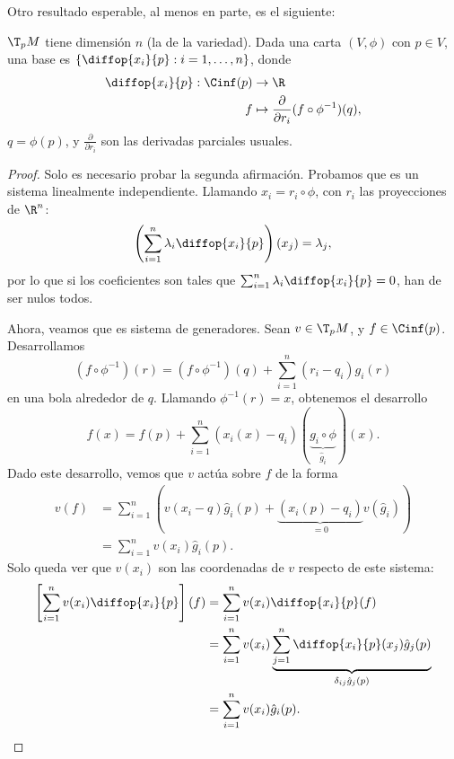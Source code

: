 Otro resultado esperable, al menos en parte, es el siguiente:
\begin{nth} \label{thm:base-parciales}
  $\T_{p}M$ tiene dimensión $n$ (la de la variedad). Dada una carta $(V,\phi)$
  con $p\in V$, una base es $\left\{ \diffop{x_{i}}{p} : i=1,\dots,n \right\}$, donde
  \begin{alignat*}{2}
    \diffop{x_{i}}{p}: \Cinf(p)  & \to \R \\
    f & \mapsto \frac{\partial}{\partial r_{i}}(f\circ \phi^{-1})(q),
  \end{alignat*}
  $q = \phi(p)$, y $\frac{\partial}{\partial r_{i}}$ son las derivadas parciales usuales.
\end{nth}
\begin{proof}
  Solo es necesario probar la segunda afirmación. Probamos que es un sistema
  linealmente independiente. Llamando $x_{i} = r_{i}\circ\phi$, con $r_{i}$ las
  proyecciones de $\R^{n}$:
  \[
    \left( \sum_{i=1}^{n} \lambda_{i} \diffop{x_{i}}{p} \right)(x_{j}) = \lambda_{j}
  ,\]
  por lo que si los coeficientes son tales que $\sum_{i=1}^{n} \lambda_{i}\diffop{x_{i}}{p}
  = 0$, han de ser nulos todos.

  Ahora, veamos que es sistema de generadores. Sean $v\in \T_{p}M$, y
  $f\in\Cinf(p)$. Desarrollamos
  \[
    (f\circ \phi^{-1})(r) = (f\circ \phi^{-1})(q) + \sum_{i=1}^{n}(r_{i}-q_{i})g_{i}(r)
  \]
  en una bola alrededor de $q$. Llamando $\phi^{-1}(r) = x$, obtenemos el
  desarrollo
  \[
    f(x) = f(p) + \sum_{i=1}^{n} (x_{i}(x) - q_{i})(\underbrace{g_{i}\circ\phi}_{\hat{g}_{i}})(x)
  .\]
  Dado este desarrollo, vemos que $v$ actúa sobre $f$ de la forma
  \begin{align*}
    v(f) & = \sum_{i=1}^{n}\left( v(x_{i}-q)\hat{g}_{i}(p) +
           \underbrace{(x_{i}(p) - q_{i})}_{=0}v(\hat{g}_{i}) \right) \\
    & = \sum_{i=1}^{n} v(x_{i})\hat{g}_{i}(p).
  \end{align*}
  Solo queda ver que $v(x_{i})$ son las coordenadas de $v$ respecto de este
  sistema:
  \begin{align*}
    \left[ \sum_{i=1}^{n} v(x_{i}) \diffop{x_{i}}{p} \right](f) & =
                                                                  \sum_{i=1}^{n}
                                                                  v(x_{i})
                                                                  \diffop{x_{i}}{p}(f)
    \\
    & = \sum_{i=1}^{n} v(x_{i}) \underbrace{\sum_{j=1}^{n} \diffop{x_{i}}{p}(x_{j})
    \hat{g}_{j}(p)}_{\delta_{ij}\hat{g}_{j}(p)} \\
    & = \sum_{i=1}^{n} v(x_{i})\hat{g}_{i}(p).
  \end{align*}
\end{proof}

